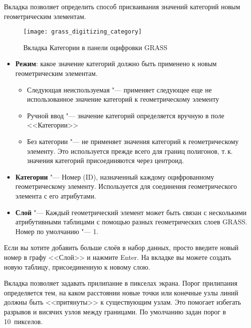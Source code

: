 
Вкладка  позволяет определить способ присваивания
значений категорий новым геометрическим элементам.

\begin{figure}[h]
 \centering
  \texttt{[image: grass\_digitizing\_category]}
  \caption{Вкладка Категории в панели оцифровки GRASS \nixcaption}\label{fig:grass_digitizing_category}
 \end{figure}

\begin{itemize}[label=--]
\item \textbf{Режим}: какое значение категорий должно быть применено к
новым геометрическим элементам.
\begin{itemize}[label=--]
\item Следующая неиспользуемая "--- применяет следующее еще не
использованное значение категорий к геометрическому элементу
\item Ручной ввод "--- значение категорий определяется вручную в
поле <<Категории>>
\item Без категории "--- не применяет значения категорий к
геометрическому элементу. Это используется прежде всего для границ
полигонов, т.\,к. значения категорий присоединяются через центроид.
\end{itemize}
\item \textbf{Категории} "--- Номер (ID), назначенный каждому
оцифрованному геометрическому элементу. Используется для соединения
геометрического элемента с его атрибутами.
\item \textbf{Слой} "--- Каждый геометрический элемент может быть
связан с несколькими атрибутивными таблицами с помощью разных
геометрических слоев GRASS. Номер по умолчанию "--- 1.
\end{itemize}

\begin{Tip}\caption{\textsc{Создание дополнительного <<слоя>> GRASS в QGIS.}}
Если вы хотите добавить больше слоёв в набор данных, просто введите
новый номер в графу <<Слой>> и нажмите Enter. На вкладке 
вы можете создать новую таблицу, присоединенную к новому слою.
\end{Tip}

\label{label_settingtab}

Вкладка  позволяет задавать прилипание в пикселах
экрана. Порог прилипания определяется тем, на каком расстоянии новые
точки или конечные узлы линий должны быть <<притянуты>> к существующим
узлам. Это помогает избегать разрывов и висячих узлов между
границами. По умолчанию задан порог в 10~пикселов.

